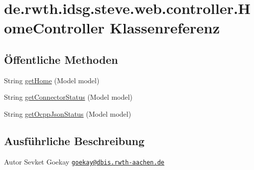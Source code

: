 \hypertarget{classde_1_1rwth_1_1idsg_1_1steve_1_1web_1_1controller_1_1_home_controller}{\section{de.\-rwth.\-idsg.\-steve.\-web.\-controller.\-Home\-Controller Klassenreferenz}
\label{classde_1_1rwth_1_1idsg_1_1steve_1_1web_1_1controller_1_1_home_controller}
}
\subsection*{Öffentliche Methoden}
\begin{DoxyCompactItemize}
\item 
String \hyperlink{classde_1_1rwth_1_1idsg_1_1steve_1_1web_1_1controller_1_1_home_controller_a92cd136a228e7c1e4fa034e8f704e483}{get\-Home} (Model model)
\item 
String \hyperlink{classde_1_1rwth_1_1idsg_1_1steve_1_1web_1_1controller_1_1_home_controller_ae7418d16011978b9e3ea9cbd7b215964}{get\-Connector\-Status} (Model model)
\item 
String \hyperlink{classde_1_1rwth_1_1idsg_1_1steve_1_1web_1_1controller_1_1_home_controller_a444d3c418aa816ec12f7685e82200790}{get\-Ocpp\-Json\-Status} (Model model)
\end{DoxyCompactItemize}


\subsection{Ausführliche Beschreibung}
\begin{DoxyAuthor}{Autor}
Sevket Goekay \href{mailto:goekay@dbis.rwth-aachen.de}{\tt goekay@dbis.\-rwth-\/aachen.\-de} 
\end{DoxyAuthor}


